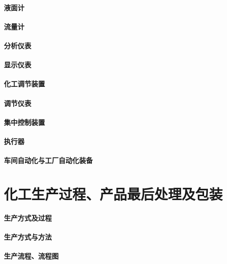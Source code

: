 \documentclass[UTF8]{../../ApplicationUniverse}
\begin{document}
        \subsubsection{液面计}
        \subsubsection{流量计}
        \subsubsection{分析仪表}
        \subsubsection{显示仪表}
    \subsubsection{化工调节装置}
        \subsubsection{调节仪表}
        \subsubsection{集中控制装置}
        \subsubsection{执行器}
    \subsubsection{车间自动化与工厂自动化装备}





\chapter{化工生产过程、产品最后处理及包装}
\subsubsection{生产方式及过程}
    \subsubsection{生产方式与方法}
    \subsubsection{生产流程、流程图}
\end{document}
